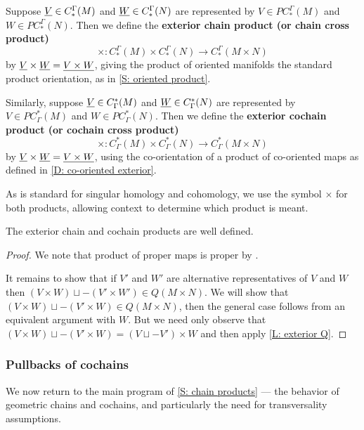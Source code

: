 \begin{definition}\label{D: exterior chain}
	Suppose $\underline{V} \in C_*^{\Gamma}(M)$ and $\underline{W} \in C_*^{\Gamma}(N)$ are represented by $V \in PC_*^{\Gamma}(M)$ and $W \in PC_*^{\Gamma}(N)$.
	Then we define the \textbf{exterior chain product (or chain cross product)} $$\times \colon C_*^{\Gamma}(M) \times C_*^{\Gamma}(N) \to C_*^{\Gamma}(M \times N)$$ by $\underline{V} \times \underline{W} = \underline{V \times W}$, giving the product of oriented manifolds the standard product orientation, as in \cref{S: oriented product}.

	Similarly, suppose $\underline{V} \in C^*_{\Gamma}(M)$ and $\underline{W} \in C^*_{\Gamma}(N)$ are represented by $V \in PC^*_{\Gamma}(M)$ and $W \in PC^*_{\Gamma}(N)$.
	Then we define the \textbf{exterior cochain product (or cochain cross product)}
	$$\times \colon C^*_{\Gamma}(M) \times C^*_{\Gamma}(N) \to C^*_{\Gamma}(M \times N)$$ by $\underline{V} \times \underline{W} = \underline{V \times W}$, using the co-orientation of a product of co-oriented maps as defined in \cref{D: co-oriented exterior}.
\end{definition}

As is standard for singular homology and cohomology, we use the symbol $\times$ for both products, allowing context to determine which product is meant.

\begin{proposition}
	The exterior chain and cochain products are well defined.
\end{proposition}

\begin{proof}
	We note that product of proper maps is proper by \cite[Proposition I.10.1.4]{Bou98}.

	It remains to show that if $V'$ and $W'$ are alternative representatives of $V$ and $W$ then $(V \times W) \sqcup -(V' \times W') \in Q(M \times N)$.
	We will show that $(V \times W) \sqcup -(V' \times W) \in Q(M \times N)$, then the general case follows from an equivalent argument with $W$.
	But we need only observe that $(V \times W) \sqcup -(V' \times W) = (V \sqcup -V') \times W$ and then apply
	\cref{L: exterior Q}.
\end{proof}


\subsubsection{Pullbacks of cochains}\label{S: product pullbacks}
We now return to the main program of \cref{S: chain products} --- the behavior of geometric chains and cochains, and particularly the need for transversality assumptions.

